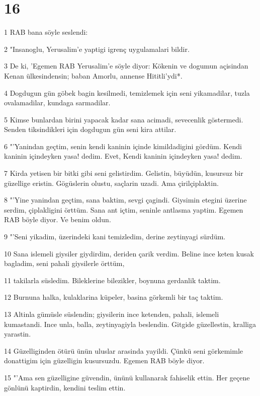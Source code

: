 \chapter{16}

\par 1 RAB bana söyle seslendi:
\par 2 "Insanoglu, Yerusalim'e yaptigi igrenç uygulamalari bildir.
\par 3 De ki, 'Egemen RAB Yerusalim'e söyle diyor: Kökenin ve dogumun açisindan Kenan ülkesindensin; baban Amorlu, annense Hititli'ydi*.
\par 4 Dogdugun gün göbek bagin kesilmedi, temizlemek için seni yikamadilar, tuzla ovalamadilar, kundaga sarmadilar.
\par 5 Kimse bunlardan birini yapacak kadar sana acimadi, sevecenlik göstermedi. Senden tiksindikleri için dogdugun gün seni kira attilar.
\par 6 "'Yanindan geçtim, senin kendi kaninin içinde kimildadigini gördüm. Kendi kaninin içindeyken yasa! dedim. Evet, Kendi kaninin içindeyken yasa! dedim.
\par 7 Kirda yetisen bir bitki gibi seni gelistirdim. Gelistin, büyüdün, kusursuz bir güzellige eristin. Gögüslerin olustu, saçlarin uzadi. Ama çirilçiplaktin.
\par 8 "'Yine yanindan geçtim, sana baktim, sevgi çagindi. Giysimin etegini üzerine serdim, çiplakligini örttüm. Sana ant içtim, seninle antlasma yaptim. Egemen RAB böyle diyor. Ve benim oldun.
\par 9 "'Seni yikadim, üzerindeki kani temizledim, derine zeytinyagi sürdüm.
\par 10 Sana islemeli giysiler giydirdim, deriden çarik verdim. Beline ince keten kusak bagladim, seni pahali giysilerle örttüm,
\par 11 takilarla süsledim. Bileklerine bilezikler, boynuna gerdanlik taktim.
\par 12 Burnuna halka, kulaklarina küpeler, basina görkemli bir taç taktim.
\par 13 Altinla gümüsle süslendin; giysilerin ince ketenden, pahali, islemeli kumastandi. Ince unla, balla, zeytinyagiyla beslendin. Gitgide güzellestin, kralliga yarastin.
\par 14 Güzelliginden ötürü ünün uluslar arasinda yayildi. Çünkü seni görkemimle donattigim için güzelligin kusursuzdu. Egemen RAB böyle diyor.
\par 15 "'Ama sen güzelligine güvendin, ününü kullanarak fahiselik ettin. Her geçene gönlünü kaptirdin, kendini teslim ettin.
